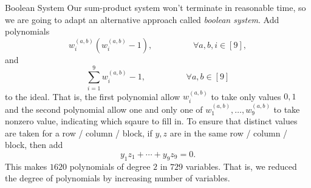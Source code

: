 \documentclass[co439]{subfiles}
\begin{document}
    \begin{boxy}{\itckabelstd Boolean System}
        Our sum-product system won't terminate in reasonable time, so we are going to adapt an alternative approach called \textit{boolean system}. Add polynomials
        \begin{equation*}
            w^{\left( a,b \right)}_i\left( w^{\left( a,b \right)}_i-1 \right), \hspace{2cm}\forall a,b,i\in\left[ 9 \right],
        \end{equation*}
        and
        \begin{equation*}
            \sum^{9}_{i=1} w^{\left( a,b \right)}_{i}-1, \hspace{2cm}\forall a,b\in\left[ 9 \right]
        \end{equation*}
        to the ideal. That is, the first polynomial allow $w_i^{\left( a,b \right)}$ to take only values $0,1$ and the second polynomial allow one and only one of $w_1^{\left( a,b \right)},\ldots,w_9^{\left( a,b \right)}$ to take nonzero value, indicating which sqaure to fill in. To ensure that distinct values are taken for a row / column / block, if $y,z$ are in the same row / column / block, then add
        \begin{equation*}
            y_1z_1 + \cdots + y_9z_9 = 0.
        \end{equation*}
        This makes $1620$ polynomials of degree $2$ in $729$ variables. That is, we reduced the degree of polynomials by increasing number of variables.
    \end{boxy}


    
    
    
    
    
    
    
    
    
    
    
    
    
    
    
    
    
    
    
    
    
    
    
    
    
    
    
    
    
    
    
    
    
    
    
    
    
\end{document}
